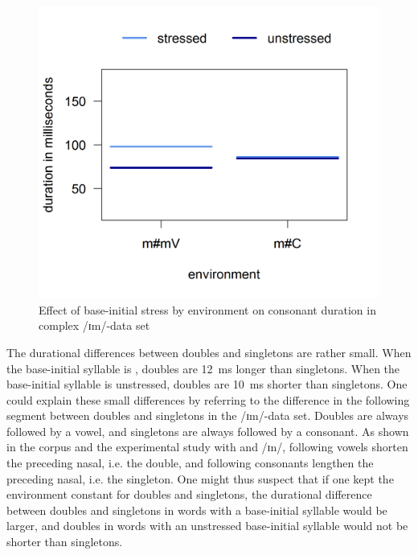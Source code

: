 \begin{figure}
 	
 	\includegraphics [scale=0.5] {images/Experiment/imModelInterEnvStress}
 	\caption{Effect of base-initial stress by environment on consonant duration in complex /ɪm/-data set}
 	\label{fig:NumNasal imComplex experiment}
 	
 \end{figure}



The durational differences between doubles and singletons are rather small.  When the base-initial syllable is , doubles are 12~ms longer than singletons. When the base-initial syllable is unstressed, doubles are 10~ms shorter than singletons. 
  One could explain these small differences by referring to the difference in the following segment between doubles and singletons in the /ɪm/-data set. Doubles are always followed by a vowel, and singletons are always followed by a consonant. As shown in the corpus and the experimental study with  and /ɪn/, following vowels shorten the preceding nasal, i.e. the double, and following consonants lengthen the preceding nasal, i.e. the singleton. One might thus suspect that if one kept the environment constant for doubles and singletons, the durational difference between doubles and singletons in words with a  base-initial syllable would be larger, and doubles in words with an unstressed base-initial syllable would not be shorter than singletons. 

